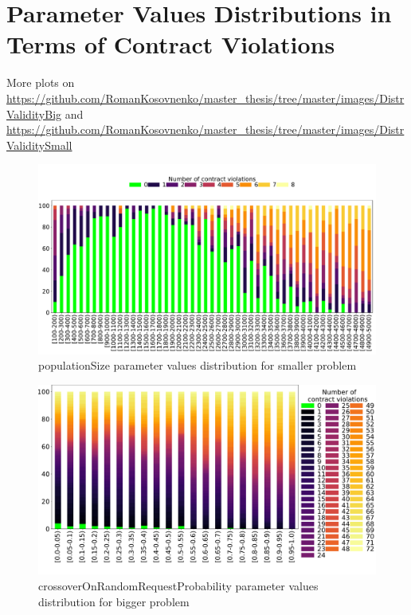 \chapter{Parameter Values Distributions in Terms of Contract Violations}\label{appendix:Distributions2}
More plots on \url{https://github.com/RomanKosovnenko/master_thesis/tree/master/images/DistrValidityBig} and \url{https://github.com/RomanKosovnenko/master_thesis/tree/master/images/DistrValiditySmall}
\begin{figure}[!htb]
	\centering
	\includegraphics[width=\textwidth]{images/DistrValiditySmall/populationSize.pdf}
	\caption[]{populationSize parameter values distribution for smaller problem}
	\label{fig:populationSize_DistSmall}
\end{figure}
\begin{figure}
	\centering
	\includegraphics[width=\textwidth]{images/DistrValidityBig/crossoverOnRandomRequestProbability.pdf}
	\caption[]{crossoverOnRandomRequestProbability parameter values distribution for bigger problem}
	\label{fig:crossoverOnRandomRequestProbability_DistBig}
\end{figure}
